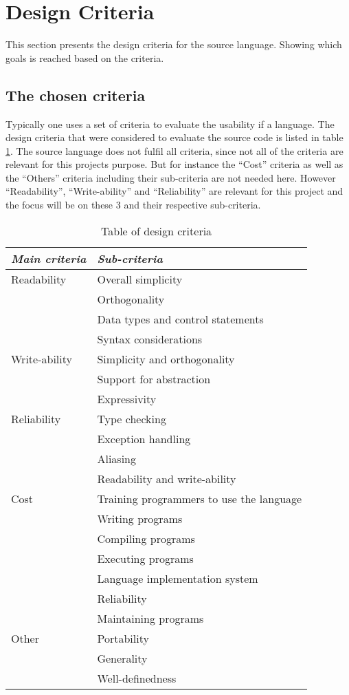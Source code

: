 \chapter{Design Criteria}\label{chap:design-criteria}
This section presents the design criteria for the source language. Showing which goals is reached based on the criteria. 

\section{The chosen criteria}
Typically one uses a set of criteria to evaluate the usability if a language. The design criteria that were considered to evaluate the source code is listed in table \ref{chap:design-criteria}. 
The source language does not fulfil all criteria, since not all of the criteria are relevant for this projects purpose. But for instance the ``Cost'' criteria as well as the ``Others'' criteria including their sub-criteria are not needed here. However ``Readability'', ``Write-ability'' and ``Reliability'' are relevant for this project and the focus will be on these 3 and their respective sub-criteria.

\begin{table}[H]
	\center
	\begin{tabular}{|l|l|}
	\hline
	\emph{Main criteria} & \emph{Sub-criteria} \\ 
 		\hline
 		Readability & Overall simplicity \\
 		 & Orthogonality \\
 		 & Data types and control statements \\
 		 & Syntax considerations \\
 		\hline
 		Write-ability & Simplicity and orthogonality  \\
 		 & Support for abstraction \\
 		 & Expressivity \\
 		\hline
 		Reliability & Type checking \\
 		 & Exception handling \\
 		 & Aliasing \\
 		 & Readability and write-ability \\
 		\hline
 		Cost & Training programmers to use the language \\
 		 & Writing programs \\
 		 & Compiling programs \\
 		 & Executing programs \\
 		 & Language implementation system \\
 		 & Reliability \\
 		 & Maintaining programs \\
 		\hline
 		Other & Portability \\
 		 & Generality \\
 		 & Well-definedness \\
 		\hline
	\end{tabular}
	\label{tab:design}
	\caption{Table of design criteria}
\end{table} 

